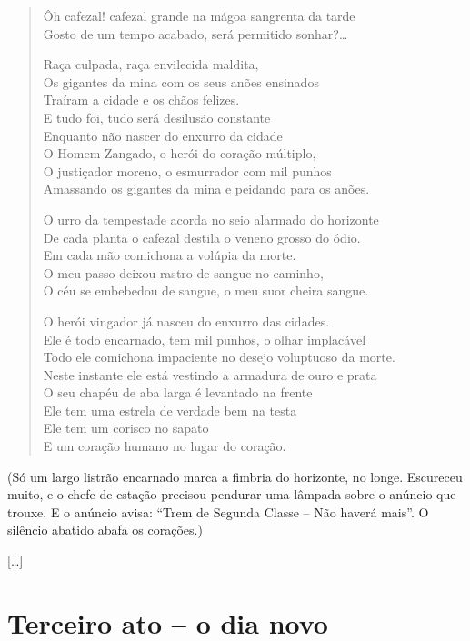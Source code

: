 {\begin{verse}
Ôh cafezal! cafezal grande na mágoa sangrenta da tarde\\
Gosto de um tempo acabado, será permitido sonhar?\ldots{}

Raça culpada, raça envilecida maldita,\\
Os gigantes da mina com os seus anões ensinados\\
Traíram a cidade e os chãos felizes.\\
E tudo foi, tudo será desilusão constante\\
Enquanto não nascer do enxurro da cidade\\
O Homem Zangado, o herói do coração múltiplo,\\
O justiçador moreno, o esmurrador com mil punhos\\
Amassando os gigantes da mina e peidando para os anões.

O urro da tempestade acorda no seio alarmado do horizonte\\
De cada planta o cafezal destila o veneno grosso do ódio.\\
Em cada mão comichona a volúpia da morte.\\
O meu passo deixou rastro de sangue no caminho,\\
O céu se embebedou de sangue, o meu suor cheira sangue.

O herói vingador já nasceu do enxurro das cidades.\\
Ele é todo encarnado, tem mil punhos, o olhar implacável\\
Todo ele comichona impaciente no desejo voluptuoso da morte.\\
Neste instante ele está vestindo a armadura de ouro e prata\\
O seu chapéu de aba larga é levantado na frente\\
Ele tem uma estrela de verdade bem na testa\\
Ele tem um corisco no sapato\\
E um coração humano no lugar do coração.
\end{verse}

\hfill\parbox{150pt}{
(Só um largo listrão encarnado marca a fimbria do horizonte, no longe.
Escureceu muito, e o chefe de estação precisou pendurar uma lâmpada
sobre o anúncio que trouxe. E o anúncio avisa: ``Trem de Segunda Classe
-- Não haverá mais''. O silêncio abatido abafa os corações.)
}

{[}\ldots{}{]}

\chapter{Terceiro ato -- o dia novo}

}
